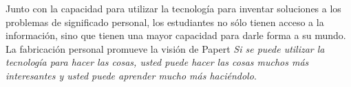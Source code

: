 \begin{itemize}
	Junto con la capacidad para utilizar la tecnología para inventar
	soluciones a los problemas de significado personal, los estudiantes no
	sólo tienen acceso a la información, sino que tienen una mayor capacidad
	para darle forma a su mundo. La fabricación personal promueve la visión
	de Papert \emph{Si se puede utilizar la tecnología para hacer las cosas,
		usted puede hacer las cosas muchos más interesantes y usted
		puede aprender mucho más haciéndolo}\cite{papertian:const}.

\end{itemize}


